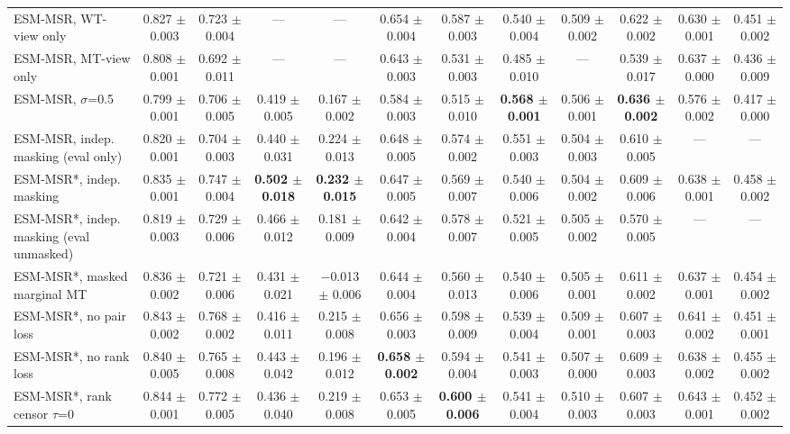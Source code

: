 \begin{table}[H]
{\begin{tabular}{lccccccccccc}
ESM-MSR, WT-view only & 0.827 $\pm$ 0.003 & 0.723 $\pm$ 0.004 & --- & --- & 0.654 $\pm$ 0.004 & 0.587 $\pm$ 0.003 & 0.540 $\pm$ 0.004 & 0.509 $\pm$ 0.002 & 0.622 $\pm$ 0.002 & 0.630 $\pm$ 0.001 & 0.451 $\pm$ 0.002 \\
ESM-MSR, MT-view only & 0.808 $\pm$ 0.001 & 0.692 $\pm$ 0.011 & --- & --- & 0.643 $\pm$ 0.003 & 0.531 $\pm$ 0.003 & 0.485 $\pm$ 0.010 & --- & 0.539 $\pm$ 0.017 & 0.637 $\pm$ 0.000 & 0.436 $\pm$ 0.009 \\
ESM-MSR, $\sigma$=0.5 & 0.799 $\pm$ 0.001 & 0.706 $\pm$ 0.005 & 0.419 $\pm$ 0.005 & 0.167 $\pm$ 0.002 & 0.584 $\pm$ 0.003 & 0.515 $\pm$ 0.010 & \textbf{0.568 $\pm$ 0.001} & 0.506 $\pm$ 0.001 & \textbf{0.636 $\pm$ 0.002} & 0.576 $\pm$ 0.002 & 0.417 $\pm$ 0.000 \\
ESM-MSR, indep. masking (eval only) & 0.820 $\pm$ 0.001 & 0.704 $\pm$ 0.003 & 0.440 $\pm$ 0.031 & 0.224 $\pm$ 0.013 & 0.648 $\pm$ 0.005 & 0.574 $\pm$ 0.002 & 0.551 $\pm$ 0.003 & 0.504 $\pm$ 0.003 & 0.610 $\pm$ 0.005 & --- & --- \\
ESM-MSR*, indep. masking & 0.835 $\pm$ 0.001 & 0.747 $\pm$ 0.004 & \textbf{0.502 $\pm$ 0.018} & \textbf{0.232 $\pm$ 0.015} & 0.647 $\pm$ 0.005 & 0.569 $\pm$ 0.007 & 0.540 $\pm$ 0.006 & 0.504 $\pm$ 0.002 & 0.609 $\pm$ 0.006 & 0.638 $\pm$ 0.001 & 0.458 $\pm$ 0.002 \\
ESM-MSR*, indep. masking (eval unmasked) & 0.819 $\pm$ 0.003 & 0.729 $\pm$ 0.006 & 0.466 $\pm$ 0.012 & 0.181 $\pm$ 0.009 & 0.642 $\pm$ 0.004 & 0.578 $\pm$ 0.007 & 0.521 $\pm$ 0.005 & 0.505 $\pm$ 0.002 & 0.570 $\pm$ 0.005 & --- & --- \\
ESM-MSR*, masked marginal MT & 0.836 $\pm$ 0.002 & 0.721 $\pm$ 0.006 & 0.431 $\pm$ 0.021 & $-$0.013 $\pm$ 0.006 & 0.644 $\pm$ 0.004 & 0.560 $\pm$ 0.013 & 0.540 $\pm$ 0.006 & 0.505 $\pm$ 0.001 & 0.611 $\pm$ 0.002 & 0.637 $\pm$ 0.001 & 0.454 $\pm$ 0.002 \\
ESM-MSR*, no pair loss & 0.843 $\pm$ 0.002 & 0.768 $\pm$ 0.002 & 0.416 $\pm$ 0.011 & 0.215 $\pm$ 0.008 & 0.656 $\pm$ 0.003 & 0.598 $\pm$ 0.009 & 0.539 $\pm$ 0.004 & 0.509 $\pm$ 0.001 & 0.607 $\pm$ 0.003 & 0.641 $\pm$ 0.002 & 0.451 $\pm$ 0.001 \\
ESM-MSR*, no rank loss & 0.840 $\pm$ 0.005 & 0.765 $\pm$ 0.008 & 0.443 $\pm$ 0.042 & 0.196 $\pm$ 0.012 & \textbf{0.658 $\pm$ 0.002} & 0.594 $\pm$ 0.004 & 0.541 $\pm$ 0.003 & 0.507 $\pm$ 0.000 & 0.609 $\pm$ 0.003 & 0.638 $\pm$ 0.002 & 0.455 $\pm$ 0.002 \\
ESM-MSR*, rank censor $\tau$=0 & 0.844 $\pm$ 0.001 & 0.772 $\pm$ 0.005 & 0.436 $\pm$ 0.040 & 0.219 $\pm$ 0.008 & 0.653 $\pm$ 0.005 & \textbf{0.600 $\pm$ 0.006} & 0.541 $\pm$ 0.004 & 0.510 $\pm$ 0.003 & 0.607 $\pm$ 0.003 & 0.643 $\pm$ 0.001 & 0.452 $\pm$ 0.002 \\

\end{tabular}}
\end{table}
